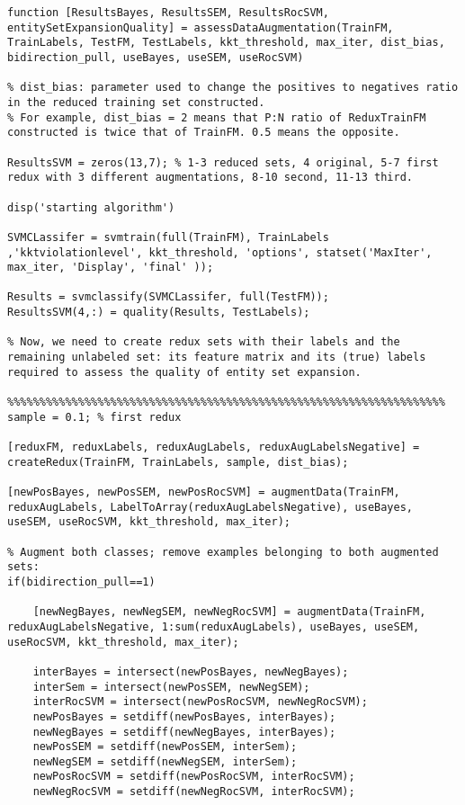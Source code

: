 \documentclass[12pt,twoside,notitlepage,amsart]{report} %
\begin{document}
\begin{lstlisting}
function [ResultsBayes, ResultsSEM, ResultsRocSVM, entitySetExpansionQuality] = assessDataAugmentation(TrainFM, TrainLabels, TestFM, TestLabels, kkt_threshold, max_iter, dist_bias, bidirection_pull, useBayes, useSEM, useRocSVM)

% dist_bias: parameter used to change the positives to negatives ratio in the reduced training set constructed. 
% For example, dist_bias = 2 means that P:N ratio of ReduxTrainFM constructed is twice that of TrainFM. 0.5 means the opposite.

ResultsSVM = zeros(13,7); % 1-3 reduced sets, 4 original, 5-7 first redux with 3 different augmentations, 8-10 second, 11-13 third.

disp('starting algorithm')

SVMCLassifer = svmtrain(full(TrainFM), TrainLabels ,'kktviolationlevel', kkt_threshold, 'options', statset('MaxIter', max_iter, 'Display', 'final' ));

Results = svmclassify(SVMCLassifer, full(TestFM));
ResultsSVM(4,:) = quality(Results, TestLabels);

% Now, we need to create redux sets with their labels and the remaining unlabeled set: its feature matrix and its (true) labels required to assess the quality of entity set expansion.

%%%%%%%%%%%%%%%%%%%%%%%%%%%%%%%%%%%%%%%%%%%%%%%%%%%%%%%%%%%%%%%%%%%%
sample = 0.1; % first redux

[reduxFM, reduxLabels, reduxAugLabels, reduxAugLabelsNegative] = createRedux(TrainFM, TrainLabels, sample, dist_bias);

[newPosBayes, newPosSEM, newPosRocSVM] = augmentData(TrainFM, reduxAugLabels, LabelToArray(reduxAugLabelsNegative), useBayes, useSEM, useRocSVM, kkt_threshold, max_iter);

% Augment both classes; remove examples belonging to both augmented sets:
if(bidirection_pull==1)
    
    [newNegBayes, newNegSEM, newNegRocSVM] = augmentData(TrainFM, reduxAugLabelsNegative, 1:sum(reduxAugLabels), useBayes, useSEM, useRocSVM, kkt_threshold, max_iter);

    interBayes = intersect(newPosBayes, newNegBayes);
    interSem = intersect(newPosSEM, newNegSEM);
    interRocSVM = intersect(newPosRocSVM, newNegRocSVM);
    newPosBayes = setdiff(newPosBayes, interBayes);
    newNegBayes = setdiff(newNegBayes, interBayes);
    newPosSEM = setdiff(newPosSEM, interSem);
    newNegSEM = setdiff(newNegSEM, interSem);
    newPosRocSVM = setdiff(newPosRocSVM, interRocSVM);
    newNegRocSVM = setdiff(newNegRocSVM, interRocSVM);
    

\end{lstlisting}
\end{document}
